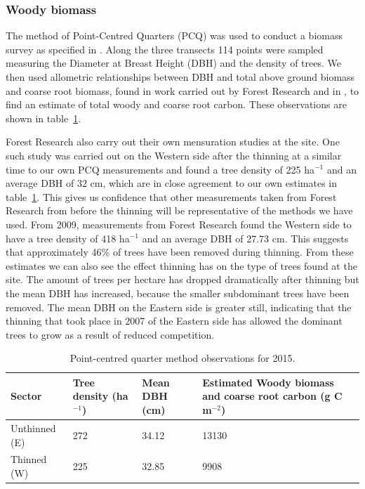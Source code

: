 \documentclass[draft,linenumbers]{agujournal}
\begin{document}
\subsubsection{Woody biomass}  
The method of Point-Centred Quarters (PCQ) was used to conduct a biomass survey as specified in \citet{dahdouh2006empirical}. Along the three transects 114 points were sampled measuring the Diameter at Breast Height (DBH) and the density of trees. We then used allometric relationships between DBH and total above ground biomass and coarse root biomass, found in work carried out by Forest Research and in \citet{mckay2003woodfuel}, to find an estimate of total woody and coarse root carbon. These observations are shown in table~\ref{table:cwoo_obs}.

Forest Research also carry out their own mensuration studies at the site. One such study was carried out on the Western side after the thinning at a similar time to our own PCQ measurements and found a tree density of 225 ha\(^{-1}\) and an average DBH of 32 cm, which are in close agreement to our own estimates in table~\ref{table:cwoo_obs}. This gives us confidence that other measurements taken from Forest Research from before the thinning will be representative of the methods we have used. From 2009, measurements from Forest Research found the Western side to have a tree density of 418 ha\(^{-1}\) and an average DBH of 27.73 cm. This suggests that approximately 46\% of trees have been removed during thinning. From these estimates we can also see the effect thinning has on the type of trees found at the site. The amount of trees per hectare has dropped dramatically after thinning but the mean DBH has increased, because the smaller subdominant trees have been removed. The mean DBH on the Eastern side is greater still, indicating that the thinning that took place in 2007 of the Eastern side has allowed the dominant trees to grow as a result of reduced competition.

\begin{table}[ht] 
	\caption{Point-centred quarter method observations for 2015.}
\begin{center}
	\begin{tabular}{| l | p{2cm} | p{2cm} | p{4.5cm} |}
	\hline
	Sector & Tree density (ha\(^{-1}\)) & Mean DBH (cm) & Estimated Woody biomass and coarse root carbon (g C m\(^{-2}\)) \\ \hline
	Unthinned (E) & 272 & 34.12 & 13130 \\ \hline
	Thinned (W) & 225 & 32.85 & 9908 \\ \hline
	\end{tabular}
	\label{table:cwoo_obs}
\end{center} 
\end{table}
\end{document}
